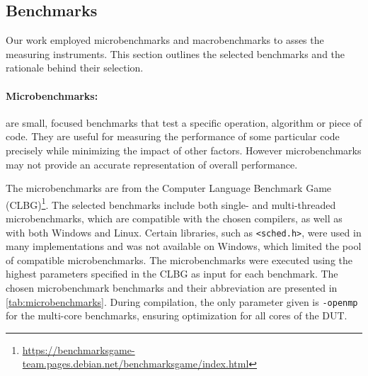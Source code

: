 \subsection{Benchmarks}\label{subsec:test_cases}

Our work employed microbenchmarks and macrobenchmarks to asses the measuring instruments. This section outlines the selected benchmarks and the rationale behind their selection.

\paragraph{Microbenchmarks:} are small, focused benchmarks that test a specific operation, algorithm or piece of code. They are useful for measuring the performance of some particular code precisely while minimizing the impact of other factors. However microbenchmarks may not provide an accurate representation of overall performance.\cite{MicroVSMacro}

The microbenchmarks are from the Computer Language Benchmark Game (CLBG)\footnote{\url{https://benchmarksgame-team.pages.debian.net/benchmarksgame/index.html}}. The selected benchmarks include both single- and multi-threaded microbenchmarks, which are compatible with the chosen compilers, as well as with both Windows and Linux. Certain libraries, such as \texttt{<sched.h>}, were used in many implementations and was not available on Windows, which limited the pool of compatible microbenchmarks. The microbenchmarks were executed using the highest parameters specified in the CLBG as input for each benchmark. The chosen microbenchmark benchmarks and their abbreviation are presented in \cref{tab:microbenchmarks}. During compilation, the only parameter given is \texttt{-openmp} for the multi-core benchmarks, ensuring optimization for all cores of the DUT. 



